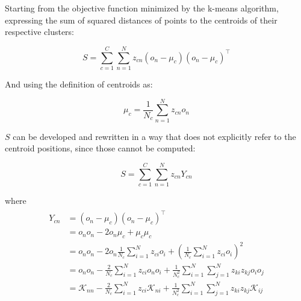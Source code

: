 \documentclass[natbib,smallextended]{svjour3}
\begin{document}
Starting from the objective function minimized by the k-means algorithm, expressing the sum of squared distances of points to the centroids of their respective clusters:

\[
S = \sum_{c=1}^{C} \sum_{n=1}^{N} z_{cn} \left(o_n-\mu_c\right)\left(o_n-\mu_c\right)^\top \label{eq:S}
\]

And using the definition of centroids as:

\[
\mu_c = \frac{1}{N_c}\sum_{n=1}^{N}z_{cn}o_n
\]

$S$ can be developed and rewritten in a way that does not explicitly refer to the centroid positions, since those cannot be computed:

\[
S = \sum_{c=1}^{C} \sum_{n=1}^{N} z_{cn} Y_{cn}
\]

where
\begin{align}
\begin{split}
Y_{cn} & =  \left(o_n-\mu_c\right)\left(o_n-\mu_c\right)^\top \\
       & =  o_no_n - 2 o_n\mu_c + \mu_c\mu_c \\
       & =  o_no_n - 2 o_n\frac{1}{N_c} \sum_{i=1}^{N} z_{ci} o_i +
       	 \left(\frac{1}{N_c} \sum_{i=1}^{N} z_{ci} o_i\right)^2 \\ %
       & =  o_no_n - \frac{2}{N_c} \sum_{i=1}^{N} z_{ci} o_no_i +
       	 \frac{1}{N_c^2} \sum_{i=1}^{N} \sum_{j=1}^{N} z_{ki} z_{kj} o_io_j \\
       & =  \mathcal{K}_{nn} - \frac{2}{N_c} \sum_{i=1}^{N} z_{ci} \mathcal{K}_{ni} +
         \frac{1}{N_c^2} \sum_{i=1}^{N} \sum_{j=1}^{N} z_{ki} z_{kj} \mathcal{K}_{ij} \label{eq:yki}
\end{split}
\end{align}

\end{document}
